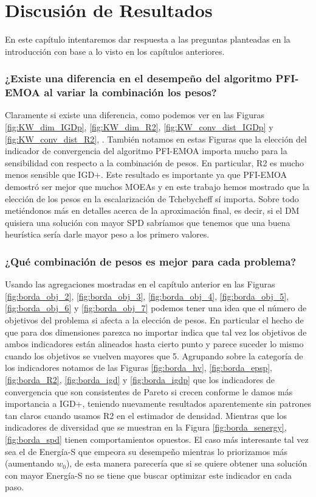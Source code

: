 \chapter{Discusión de Resultados}

En este capítulo intentaremos dar respuesta a las preguntas planteadas en la introducción con base a lo visto en los capítulos anteriores.

\subsection*{¿Existe una diferencia en el desempeño del algoritmo PFI-EMOA al variar la combinación los pesos?}

Claramente si existe una diferencia, como podemos ver en las Figuras \ref{fig:KW_dim_IGDp}, \ref{fig:KW_dim_R2}, \ref{fig:KW_conv_dist_IGDp} y \ref{fig:KW_conv_dist_R2}, . También notamos en estas Figuras que la elección del indicador de convergencia del algoritmo PFI-EMOA importa mucho para la sensibilidad con respecto a la combinación de pesos. En particular, R2 es mucho menos sensible que IGD+. Este resultado es importante ya que PFI-EMOA demostró ser mejor que muchos MOEAs  y en este trabajo hemos mostrado que la elección de los pesos en la escalarización de Tchebycheff sí importa. Sobre todo metiéndonos más en detalles acerca de la aproximación final, es decir, si el DM quisiera una solución con mayor SPD sabríamos que tenemos que una buena heurística sería darle mayor peso a los primero valores. 

\subsection*{¿Qué combinación de pesos es mejor para cada problema?}

Usando las agregaciones mostradas en el capítulo anterior en las Figuras \ref{fig:borda_obj_2}, \ref{fig:borda_obj_3}, \ref{fig:borda_obj_4}, \ref{fig:borda_obj_5}, \ref{fig:borda_obj_6} y \ref{fig:borda_obj_7} podemos tener una idea que el número de objetivos del problema si afecta a la elección de pesos. En particular el hecho de que para dos dimensiones parezca no importar indica que tal vez los objetivos de ambos indicadores están alineados hasta cierto punto y parece suceder lo mismo cuando los objetivos se vuelven mayores que 5. Agrupando sobre la categoría de los indicadores notamos de las Figuras \ref{fig:borda_hv}, \ref{fig:borda_epsp}, \ref{fig:borda_R2}, \ref{fig:borda_igd} y \ref{fig:borda_igdp}  que los indicadores de convergencia que son consistentes de Pareto si crecen conforme le damos más importancia a IGD+, teniendo nuevamente resultados aparentemente sin patrones tan claros cuando usamos R2 en el estimador de densidad. Mientras que los indicadores de diversidad que se muestran en la Figura \ref{fig:borda_senergy}, \ref{fig:borda_spd} tienen comportamientos opuestos. El caso más interesante tal vez sea el de Energía-S que empeora su desempeño mientras lo priorizamos más (aumentando $w_0$), de esta manera parecería que si se quiere obtener una solución con mayor Energía-S no se tiene que buscar optimizar este indicador en cada paso.   

